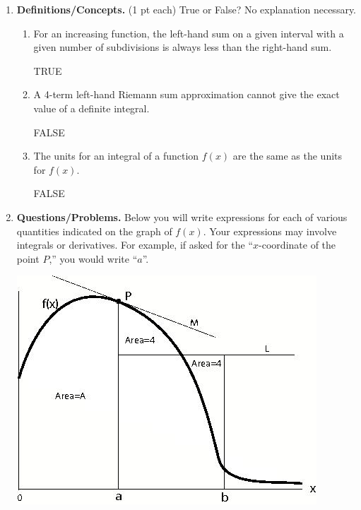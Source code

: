 \documentclass[11pt,letterpaper]{article}
\begin{document}
\begin{enumerate}
\item \textbf{Definitions/Concepts.} (1 pt each) True or False?  No explanation necessary.
\begin{enumerate}
 \item For an increasing function, the left-hand sum on a given interval with a given number of subdivisions is always less than the right-hand sum.

\vspace{0.5pc}
TRUE

\vspace{0.5pc}
\item A 4-term left-hand Riemann sum approximation cannot give the exact value of a definite integral.

\vspace{0.5pc}
FALSE

\vspace{0.5pc}
\item The units for an integral of a function $f(x)$ are the same as the units for $f(x)$.

\vspace{0.5pc}
FALSE
\end{enumerate}

\vspace{1.5pc}
\item \textbf{Questions/Problems.}  
\noindent Below you will write expressions for
each of various quantities indicated on the graph of
$f(x)$. Your
expressions may involve integrals or derivatives. For
example, if
asked for the ``$x$-coordinate of the point $P$,'' you
would write
``$a$''.

\begin{center}
 \includegraphics[scale=.8]{./q10.jpeg}
\end{center}


\end{enumerate}
\end{document}
